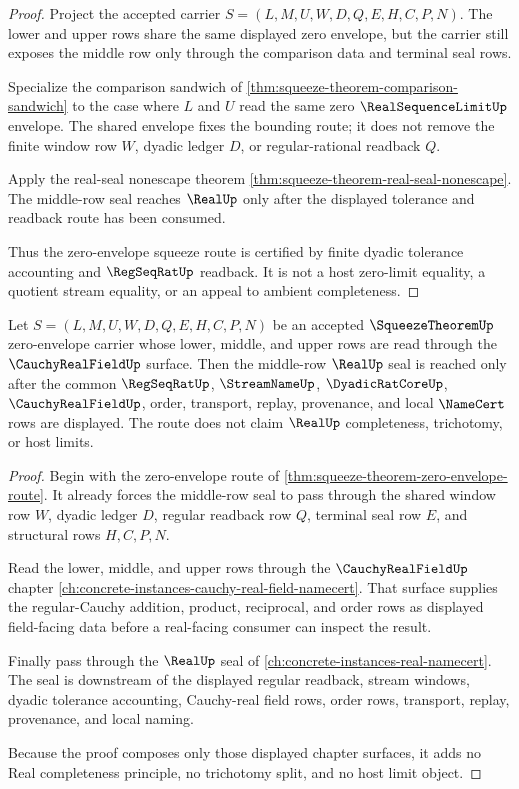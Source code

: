 \begin{proof}
Project the accepted carrier $S=(L,M,U,W,D,Q,E,H,C,P,N)$. The lower and upper rows share the same displayed zero envelope, but the carrier still exposes the middle row only through the comparison data and terminal seal rows.

Specialize the comparison sandwich of \autoref{thm:squeeze-theorem-comparison-sandwich} to the case where $L$ and $U$ read the same zero $\RealSequenceLimitUp$ envelope. The shared envelope fixes the bounding route; it does not remove the finite window row $W$, dyadic ledger $D$, or regular-rational readback $Q$.

Apply the real-seal nonescape theorem \autoref{thm:squeeze-theorem-real-seal-nonescape}. The middle-row seal reaches $\RealUp$ only after the displayed tolerance and readback route has been consumed.

Thus the zero-envelope squeeze route is certified by finite dyadic tolerance accounting and $\RegSeqRatUp$ readback. It is not a host zero-limit equality, a quotient stream equality, or an appeal to ambient completeness.
\end{proof}

\begin{theorem}
\label{thm:squeeze-theorem-cauchy-real-field-route}
Let $S=(L,M,U,W,D,Q,E,H,C,P,N)$ be an accepted $\SqueezeTheoremUp$ zero-envelope carrier whose lower, middle, and upper rows are read through the $\CauchyRealFieldUp$ surface. Then the middle-row $\RealUp$ seal is reached only after the common $\RegSeqRatUp$, $\StreamNameUp$, $\DyadicRatCoreUp$, $\CauchyRealFieldUp$, order, transport, replay, provenance, and local $\NameCert$ rows are displayed. The route does not claim $\RealUp$ completeness, trichotomy, or host limits.
\end{theorem}
\begin{proof}
Begin with the zero-envelope route of \autoref{thm:squeeze-theorem-zero-envelope-route}. It already forces the middle-row seal to pass through the shared window row $W$, dyadic ledger $D$, regular readback row $Q$, terminal seal row $E$, and structural rows $H,C,P,N$.

Read the lower, middle, and upper rows through the $\CauchyRealFieldUp$ chapter \autoref{ch:concrete-instances-cauchy-real-field-namecert}. That surface supplies the regular-Cauchy addition, product, reciprocal, and order rows as displayed field-facing data before a real-facing consumer can inspect the result.

Finally pass through the $\RealUp$ seal of \autoref{ch:concrete-instances-real-namecert}. The seal is downstream of the displayed regular readback, stream windows, dyadic tolerance accounting, Cauchy-real field rows, order rows, transport, replay, provenance, and local naming.

Because the proof composes only those displayed chapter surfaces, it adds no Real completeness principle, no trichotomy split, and no host limit object.
\end{proof}

